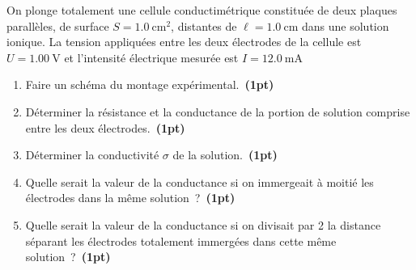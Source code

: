 On plonge totalement une cellule conductimétrique constituée de deux plaques
parallèles, de surface $S=\qty{1.0}{\square\cm}$, distantes de
$\ell=\qty{1.0}{\cm}$ dans une solution ionique. La tension appliquées entre les
deux électrodes de la cellule est $U=\qty{1.00}{\V}$ et l'intensité électrique
mesurée est $I=\qty{12.0}{\mA}$
\begin{enumerate}
    \item Faire un schéma du montage expérimental.~\textbf{(1pt)}
    \item Déterminer la résistance et la conductance de la portion de solution
          comprise entre les deux électrodes.~\textbf{(1pt)}
    \item Déterminer la conductivité $\sigma$ de la solution.~\textbf{(1pt)}
    \item Quelle serait la valeur de la conductance si on immergeait à moitié
          les électrodes dans la même solution~?~\textbf{(1pt)}
    \item Quelle serait la valeur de la conductance si on divisait par 2 la
          distance séparant les électrodes totalement immergées dans cette même
          solution~?~\textbf{(1pt)}
\end{enumerate}
